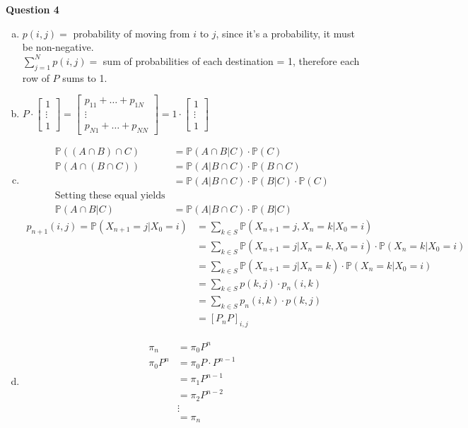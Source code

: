 \documentclass[12pt, letterpaper]{article}
\begin{document}
\noindent \textbf{Question 4}
\begin{enumerate}[a.]
    \item $p(i,j) = $ probability of moving from $i$ to $j$, since it's a probability, it must be non-negative.\\
    $\sum_{j=1}^{N}p(i,j) = $ sum of probabilities of each destination = 1, therefore each row of $P$ sums to 1.
    \item $P\cdot \begin{bmatrix}
        1 \\ \vdots \\ 1
    \end{bmatrix} = \begin{bmatrix}
        p_{11} + \dots + p_{1N} \\
        \vdots \\
        p_{N1} + \dots + p_{NN}
    \end{bmatrix} = 1\cdot \begin{bmatrix}
        1 \\ \vdots \\ 1
    \end{bmatrix}$
    \item \begin{align*}
        \mathbb{P}((A\cap B) \cap C) &= \mathbb{P}(A\cap B | C)\cdot \mathbb{P}(C) \\
        \mathbb{P}(A\cap (B \cap C)) &= \mathbb{P}(A | B\cap C)\cdot \mathbb{P}(B \cap C) \\
        &=\mathbb{P}(A | B\cap C)\cdot \mathbb{P}(B | C) \cdot \mathbb{P}(C)\\
        \text{Setting these equal yields} & \\
        \mathbb{P}(A\cap B | C) &= \mathbb{P}(A | B\cap C)\cdot \mathbb{P}(B | C)
    \end{align*}
    \begin{align*}
        p_{n+1}(i,j) = \mathbb{P}(X_{n+1} = j | X_0 = i) &= \sum_{k\in S} \mathbb{P}(X_{n+1}=j, X_n = k | X_0 =i) \\
        &= \sum_{k\in S} \mathbb{P}(X_{n+1}=j | X_n =k, X_0 = i) \cdot \mathbb{P}(X_n =k | X_0 = i) \\
        &= \sum_{k\in S} \mathbb{P}(X_{n+1}=j | X_n =k) \cdot \mathbb{P}(X_n =k | X_0 = i) \\
        &= \sum_{k\in S} p(k,j) \cdot p_n(i,k) \\
        &= \sum_{k\in S} p_n(i,k) \cdot p(k,j) \\
        &= [P_nP]_{i,j}
    \end{align*}
    \item \begin{align*}
        \pi_n &= \pi_0P^n \\
        \pi_0P^n &= \pi_0 P \cdot P^{n-1} \\
        &= \pi_1P^{n-1} \\
        &= \pi_2P^{n-2} \\
        & \vdots \\
        &= \pi_n
    \end{align*}
\end{enumerate}
\end{document}
